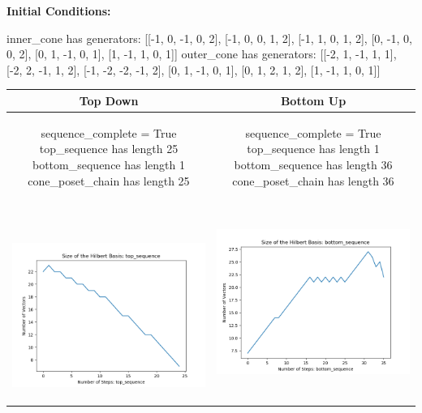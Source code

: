 \documentclass[10pt]{article}
\begin{document}
\textbf{Initial Conditions:}
\begin{SAGE}
inner_cone has generators: 
[[-1, 0, -1, 0, 2], [-1, 0, 0, 1, 2], [-1, 1, 0, 1, 2], [0, -1, 0, 0, 2], [0, 1, -1, 0, 1], [1, -1, 1, 0, 1]]
outer_cone has generators: 
[[-2, 1, -1, 1, 1], [-2, 2, -1, 1, 2], [-1, -2, -2, -1, 2], [0, 1, -1, 0, 1], [0, 1, 2, 1, 2], [1, -1, 1, 0, 1]]

\end{SAGE}
\begin{tabular}{c|c}
\textbf{Top Down} & \textbf{Bottom Up} \\ \hline  
\begin{SAGE}
	sequence_complete = True
	top_sequence has length 25
	bottom_sequence has length 1
	cone_poset_chain has length 25
\end{SAGE} 
&
\begin{SAGE}
	sequence_complete = True
	top_sequence has length 1
	bottom_sequence has length 36
	cone_poset_chain has length 36
\end{SAGE} 
\\ \hline
\
\begin{minipage}{.45\textwidth}
\includegraphics[width=\textwidth]{"DATA/5d/6 generators 2 bound H/top_sequence SIZE"}
\end{minipage} &
\begin{minipage}{.45\textwidth}
\includegraphics[width=\textwidth]{"DATA/5d/6 generators 2 bound H bottomup/bottom_sequence SIZE"}

\end{minipage}
\end{tabular}
\end{document}
